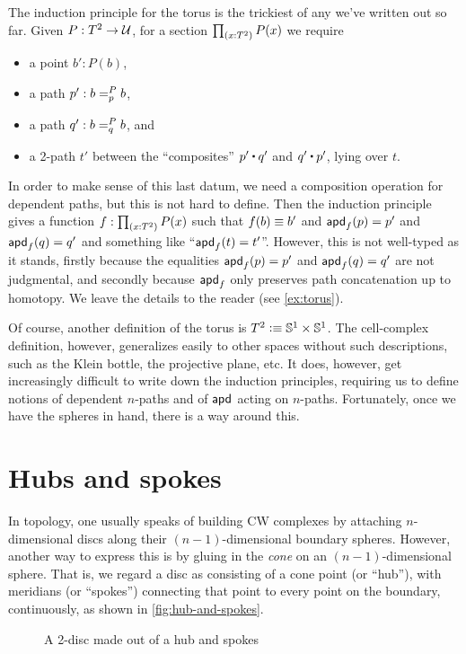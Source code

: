The induction principle for the torus is the trickiest of any we've written out so far.
Given $P:T^2\to\type$, for a section $\prd{x:T^2} P(x)$ we require
\begin{itemize}
\item a point $b':P(b)$,
\item a path $p' : \dpath P p b b$,
\item a path $q' : \dpath P q b b$, and
\item a 2-path $t'$ between the ``composites'' $p'\ct q'$ and $q'\ct p'$, lying over $t$.
\end{itemize}
In order to make sense of this last datum, we need a composition operation for dependent paths, but this is not hard to define.
Then the induction principle gives a function $f:\prd{x:T^2} P(x)$ such that $f(b)\jdeq b'$ and $\apd f {p} = p'$ and $\apd f {q} = q'$ and something like ``$\apd f t = t'$''.
However, this is not well-typed as it stands, firstly because the equalities $\apd f {p} = p'$ and $\apd f {q} = q'$ are not judgmental, and secondly because $\apdfunc f$ only preserves path concatenation up to homotopy.
We leave the details to the reader (see \autoref{ex:torus}).

Of course, another definition of the torus is $T^2 \defeq \Sn^1 \times \Sn^1$.
The cell-complex definition, however, generalizes easily to other spaces without such descriptions, such as the Klein bottle, the projective plane, etc.
It does, however, get increasingly difficult to write down the induction principles, requiring us to define notions of dependent $n$-paths and of $\apdfunc{}$ acting on $n$-paths.
Fortunately, once we have the spheres in hand, there is a way around this.


\section{Hubs and spokes}
\label{sec:hubs-spokes}

In topology, one usually speaks of building CW complexes by attaching $n$-dimensional discs along their $(n-1)$-dimensional boundary spheres.
However, another way to express this is by gluing in the \emph{cone} on an $(n-1)$-dimensional sphere.
That is, we regard a disc as consisting of a cone point (or ``hub''), with meridians (or ``spokes'') connecting that point to every point on the boundary, continuously, as shown in \autoref{fig:hub-and-spokes}.

\begin{figure}
  \centering
  \caption{A 2-disc made out of a hub and spokes}
  \label{fig:hub-and-spokes}
\end{figure}

